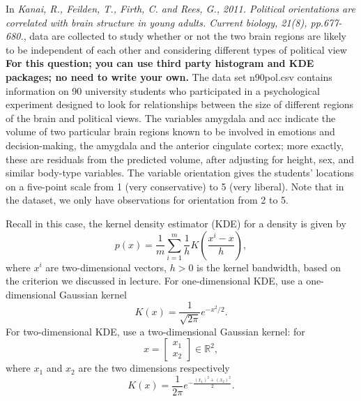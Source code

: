 \documentclass[12pt]{article}
\begin{document}
In {\it Kanai, R., Feilden, T., Firth, C. and Rees, G., 2011. Political orientations are correlated with brain structure in young adults. Current biology, 21(8), pp.677-680.}, data are collected to  study whether or not the two brain regions are likely to be independent of each other and considering different types of political view \textbf{For this question; you can use third party histogram and KDE packages; no need to write your own.} The data set \textsf{n90pol.csv} contains information on 90 university students who participated in a psychological experiment designed to look for relationships between the size of different regions of the brain and political views. The variables \textsf{amygdala} and \textsf{acc} indicate the volume of two particular brain regions known to be involved in emotions and decision-making, the amygdala and the anterior cingulate cortex; more exactly, these are residuals from the predicted volume, after adjusting for height, sex, and similar body-type variables. The variable \textsf{orientation} gives the students' locations on a five-point scale from 1 (very conservative) to 5 (very liberal).  Note that in the dataset, we only have observations for orientation from 2 to 5. 

Recall in this case, the kernel density estimator (KDE) for a density is given by
 \[
 p(x) = \frac 1 m \sum_{i=1}^m \frac 1 h
 K\left(
 \frac{x^i - x}{h}
 \right),
 \]
where $x^i$ are two-dimensional vectors, $h >0$ is the kernel bandwidth, based on the criterion we discussed in lecture. 
For one-dimensional KDE,  use a one-dimensional Gaussian kernel
\[
K(x) = \frac{1}{\sqrt{2\pi}} e^{-x^2/2}.
\]
For two-dimensional KDE, use a two-dimensional Gaussian kernel: for \[x = \begin{bmatrix}x_1\\x_2\end{bmatrix}\in \mathbb R^2,\] where $x_1$ and $x_2$ are the two dimensions respectively \[K(x) = \frac{1}{2\pi} e^{-\frac{(x_1)^2 + (x_2)^2}{2}}.\] 
  
\end{document}
